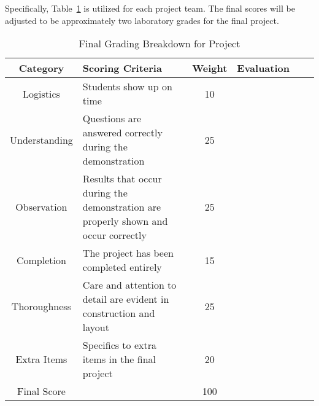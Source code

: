 \documentclass{article}
\begin{document}
Specifically, Table~\ref{grade.tbl} is utilized for each project team.
The final scores will be adjusted to be approximately two laboratory
grades for the final project. 
\begin{table} [h!]
  \centering
  {\scriptsize
  \begin{tabular}{|c|l|c|c|c|c|} \hline
    Category & Scoring Criteria & Weight & Evaluation \\ \hline \hline
    Logistics & Students show up on time & 10 & \\ \hline
    Understanding & Questions are answered correctly during the
    demonstration  & 25 & \\ \hline
    Observation & Results that occur during the demonstration are
    properly shown and occur correctly & 25 & \\ \hline
    Completion & The project has been completed entirely & 15 &
    \\ \hline
    Thoroughness & Care and attention to detail are evident in
    construction and layout & 25 & \\ \hline
    Extra Items & Specifics to extra items in the final project & 20 &
    \\ \hline \hline
    Final Score  & & 100 & \\ \hline
  \end{tabular}
  }
  \caption{Final Grading Breakdown for Project}
  \label{grade.tbl}
\end{table}


    


\end{document}
